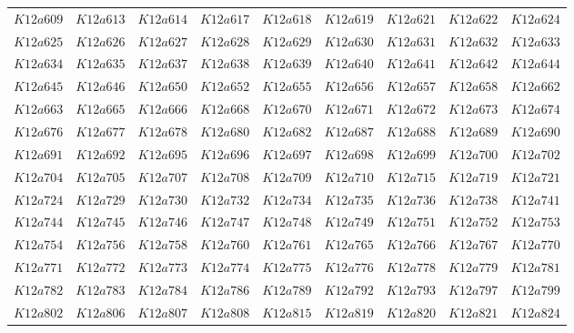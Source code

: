 \documentclass{amsart} %
\theoremstyle{thm}
\theoremstyle{definition}
\numberwithin{equation}{section}
\begin{document}
{\begin{longtable}{@{}lllllllll@{}}
  $K12a609$ &  
  $K12a613$ &  
  $K12a614$ &  
  $K12a617$ &  
  $K12a618$ &  
  $K12a619$ &  
  $K12a621$ &  
  $K12a622$ &  
  $K12a624$ \\   
  $K12a625$ &  
  $K12a626$ &  
  $K12a627$ &  
  $K12a628$ &  
  $K12a629$ &  
  $K12a630$ &  
  $K12a631$ &  
  $K12a632$ &  
  $K12a633$ \\   
  $K12a634$ &  
  $K12a635$ &  
  $K12a637$ &  
  $K12a638$ &  
  $K12a639$ &  
  $K12a640$ &  
  $K12a641$ &  
  $K12a642$ &  
  $K12a644$ \\   
  $K12a645$ &  
  $K12a646$ &  
  $K12a650$ &  
  $K12a652$ &  
  $K12a655$ &  
  $K12a656$ &  
  $K12a657$ &  
  $K12a658$ &  
  $K12a662$ \\   
  $K12a663$ &  
  $K12a665$ &  
  $K12a666$ &  
  $K12a668$ &  
  $K12a670$ &  
  $K12a671$ &  
  $K12a672$ &  
  $K12a673$ &  
  $K12a674$ \\   
  $K12a676$ &  
  $K12a677$ &  
  $K12a678$ &  
  $K12a680$ &  
  $K12a682$ &  
  $K12a687$ &  
  $K12a688$ &  
  $K12a689$ &  
  $K12a690$ \\   
  $K12a691$ &  
  $K12a692$ &  
  $K12a695$ &  
  $K12a696$ &  
  $K12a697$ &  
  $K12a698$ &  
  $K12a699$ &  
  $K12a700$ &  
  $K12a702$ \\   
  $K12a704$ &  
  $K12a705$ &  
  $K12a707$ &  
  $K12a708$ &  
  $K12a709$ &  
  $K12a710$ &  
  $K12a715$ &  
  $K12a719$ &  
  $K12a721$ \\   
  $K12a724$ &  
  $K12a729$ &  
  $K12a730$ &  
  $K12a732$ &  
  $K12a734$ &  
  $K12a735$ &  
  $K12a736$ &  
  $K12a738$ &  
  $K12a741$ \\   
  $K12a744$ &  
  $K12a745$ &  
  $K12a746$ &  
  $K12a747$ &  
  $K12a748$ &  
  $K12a749$ &  
  $K12a751$ &  
  $K12a752$ &  
  $K12a753$ \\   
  $K12a754$ &  
  $K12a756$ &  
  $K12a758$ &  
  $K12a760$ &  
  $K12a761$ &  
  $K12a765$ &  
  $K12a766$ &  
  $K12a767$ &  
  $K12a770$ \\   
  $K12a771$ &  
  $K12a772$ &  
  $K12a773$ &  
  $K12a774$ &  
  $K12a775$ &  
  $K12a776$ &  
  $K12a778$ &  
  $K12a779$ &  
  $K12a781$ \\   
  $K12a782$ &  
  $K12a783$ &  
  $K12a784$ &  
  $K12a786$ &  
  $K12a789$ &  
  $K12a792$ &  
  $K12a793$ &  
  $K12a797$ &  
  $K12a799$ \\   
  $K12a802$ &  
  $K12a806$ &  
  $K12a807$ &  
  $K12a808$ &  
  $K12a815$ &  
  $K12a819$ &  
  $K12a820$ &  
  $K12a821$ &  
  $K12a824$ \\   

\end{longtable}}
\end{document}

